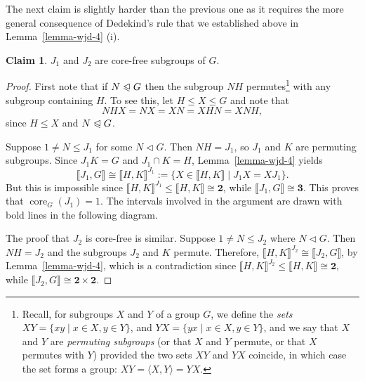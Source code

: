 \documentclass{gen-j-l}
\newcommand{\lb}{\ensuremath{\llbracket}}
\newcommand{\rb}{\ensuremath{\rrbracket}}
\newcommand{\<}{\ensuremath{\langle}}
\renewcommand{\>}{\ensuremath{\rangle}}
\theoremstyle{plain}
\theoremstyle{definition}
\newcounter{claim}
\newtheorem{claim}[claim]{Claim}
\theoremstyle{remark}
\numberwithin{theorem}{section}
\numberwithin{claim}{section}
\numberwithin{equation}{section}
\numberwithin{conjecture}{section}
\newcommand{\defn}[1]{\emph{#1}}
\renewcommand{\leq}{\ensuremath{\leqslant}}
\newcommand{\ssubnormal}{\ensuremath{\vartriangleleft}}
\newcommand{\subnormal}{\ensuremath{\trianglelefteqslant}}
\newcommand{\core}{\ensuremath{\operatorname{core}}}
\newcommand{\2}{\ensuremath{\mathbf{2}}}
\newcommand{\3}{\ensuremath{\mathbf{3}}}
\newcommand{\two}{\ensuremath{\mathbf{2}}}
\begin{document}
The next claim is slightly harder than the previous one as it requires the
more general consequence of Dedekind's rule that we established above in
Lemma~\ref{lemma-wjd-4} (i). 
\begin{claim}
$J_1$ and $J_2$ are core-free subgroups of $G$.
\end{claim}
\begin{proof}
First note that if $N\subnormal G$ then the subgroup $NH$
permutes\footnote{Recall, for subgroups $X$ and $Y$ of a group $G$, we define
  the \emph{sets} $XY = \{xy\mid x\in X, y \in Y\}$, and
  $YX = \{yx\mid x\in X, y \in Y\}$, and 
we say that $X$ and $Y$ are \defn{permuting subgroups} (or that $X$ and $Y$
permute, or that $X$ permutes with $Y$)
 provided the two sets $XY$ and $YX$ coincide, in which case the set forms a group:
$XY = \<X,Y\> = YX$.}
with any subgroup
containing $H$.  To see this, let $H \leq X \leq G$ and note that
\[
  NHX = NX = XN= XHN = XNH,
\]
since $H \leq X$ and $N\subnormal G$.

Suppose $1\neq N\leq J_1$ for some $N \ssubnormal G$. Then $NH = J_1$, so $J_1$ and $K$ are
permuting subgroups.
Since $J_1K = G$ and $J_1\cap K = H$,
Lemma~\ref{lemma-wjd-4} yields
\[
\lb J_1, G \rb \cong \lb H, K \rb^{J_1} := \{X \in\lb H, K \rb \mid J_1X=XJ_1 \}.
\]
But this is impossible since $\lb H, K \rb^{J_1} \leq \lb H,  K \rb \cong \2$, while
$\lb J_1, G \rb\cong \3$.
This proves that $\core_G(J_1) = 1$.
The intervals involved in the argument are drawn with bold lines in the
following diagram.
\begin{center}
  {
 }
\end{center}

The proof 
that $J_2$ is core-free is similar.  Suppose
$1\neq N\leq J_2$ where $N \ssubnormal G$. Then $NH = J_2$ and the subgroups $J_2$ and $K$
permute.
Therefore, $\lb H, K \rb^{J_2} \cong \lb J_2, G \rb$, 
by Lemma~\ref{lemma-wjd-4},
which is a contradiction since
$\lb H, K\rb^{J_2} \leq \lb H,  K\rb \cong \2$, while $\lb J_2, G \rb\cong \two \times \two$.
\end{proof}
\end{document}

